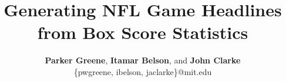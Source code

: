 \documentclass[12pt, journal]{IEEEtran}
\begin{document}
%
\title{Generating NFL Game Headlines from Box Score Statistics}

%
%
%

\author{\textbf{Parker Greene}, \textbf{Itamar Belson}, and \textbf{John Clarke}\\\{pwgreene, ibelson, jaclarke\}@mit.edu\\}

% 
%



% 
\end{document}
